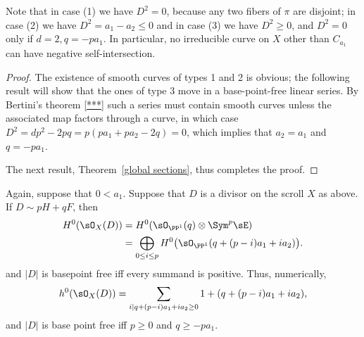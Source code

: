 Note that in case (1) we have $D^{2} = 0$, because any two fibers of $\pi$ are disjoint; in case (2) we have $D^{2}= a_{1}-a_{2}\leq 0$ and in case (3) we have $D^{2}\geq 0$, and $D^2=0$ only if
$d=2, q = -pa_1$. In particular, no irreducible curve
on $X$ other than $C_{a_1}$ can have negative self-intersection.

\begin{proof}
The existence of smooth curves of types 1 and 2 is obvious; the following result will show that
the ones of type 3 move in a base-point-free linear series. By Bertini's theorem \ref{***} such a series must contain smooth curves unless the associated map factors through a curve, in which case $D^2 = dp^2-2pq = p(pa_1+pa_2 -2 q) = 0$, which implies that $a_2=a_1$ and $q= -pa_1$.

The next result, Theorem~\ref{global sections}, thus completes the proof.
\end{proof}

\begin{theorem}\label{global sections} Again, suppose that $0<a_{1}$.
Suppose that $D$ is a divisor on the scroll $X$ as above. If $D \sim pH+qF$, then 
\begin{align*}
 H^{0}(\sO_{X}(D)) &= H^{0}(\sO_{\PP^{1}}(q) \otimes \Sym^{p} \sE)\\
 &= 
\bigoplus_{0\leq i\leq p}H^{0}\bigl(\sO_{\PP^{1}}(q + (p-i)a_{1}+i a_{2})\bigr).
\end{align*}
and $|D|$ is basepoint free iff every summand is positive.
Thus, numerically,
$$
h^{0}(\sO_{X}(D)) = 
\sum_{i \mid q+(p-i)a_{1}+i a_{2} \geq 0}1+(q + (p-i)a_{1}+i a_{2}),
$$
and
$|D|$ is base point free iff $p\geq 0$ and $q\geq -pa_{1}$.
\end{theorem}

